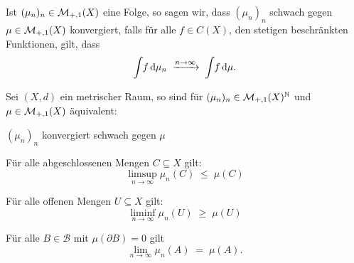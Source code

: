 \documentclass[../main/main.tex]{subfiles}
\begin{document}
	\begin{Definition}
		Ist $(\mu_n)_n \in \mathcal{M}_{+,1}(X)$ eine Folge, so sagen wir, dass $(\mu_n)_n$ schwach gegen $\mu \in \mathcal{M}_{+,1}(X)$ konvergiert, falls
		für alle $f \in C(X)$, den stetigen beschränkten Funktionen, gilt, dass
		$$\int_{} \, f \, \mathrm{d}\mu_n \; \xrightarrow{n \to \infty} \; \int_{} \, f \, \mathrm{d}\mu \text{.}$$
	\end{Definition}

	\begin{Satz}[Portmanteau]
		Sei $(X, d)$ ein metrischer Raum, so sind für $(\mu_n)_n \in \mathcal{M}_{+,1}(X)^{\mathbb{N}}$ und $\mu \in \mathcal{M}_{+,1}(X)$ äquivalent:
		\begin{equivalentthm}
			\item $(\mu_n)_n$ konvergiert schwach gegen $\mu$
			\item Für alle abgeschlossenen Mengen $C \subseteq X$ gilt: $$\limsup_{n \to \infty} \mu_n(C) \; \leq \; \mu(C)$$
			\item Für alle offenen Mengen $U \subseteq X$ gilt: $$\liminf_{n \to \infty} \mu_n(U) \; \geq \; \mu(U)$$
			\item Für alle $B \in \mathcal{B}$ mit $\mu(\partial B) = 0$ gilt $$\lim_{n \to \infty} \mu_n(A) \; = \; \mu(A) \text{.}$$
		\end{equivalentthm}
	\end{Satz}
\end{document}
